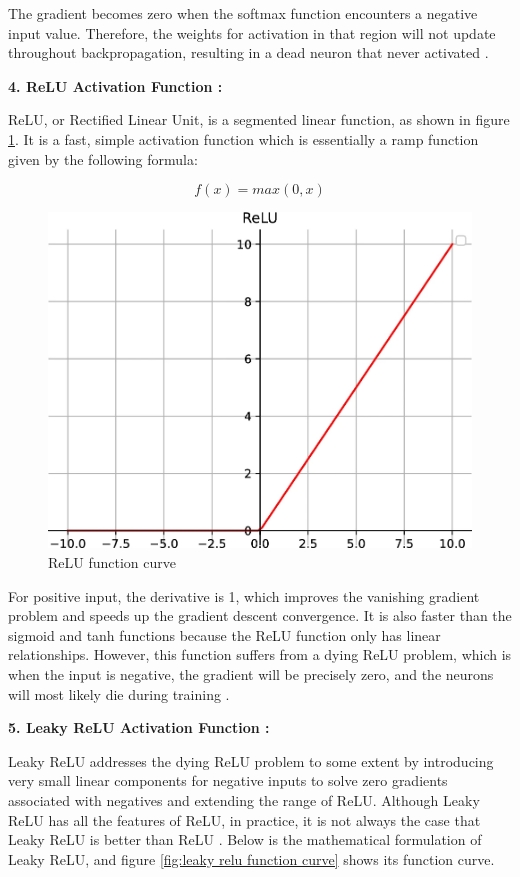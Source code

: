 The gradient becomes zero when the softmax function encounters a negative input value. Therefore, the weights for activation in that region will not update throughout backpropagation, resulting in a dead neuron that never activated \cite{Zhao2024}.

\textbf{4. ReLU Activation Function :}

ReLU, or Rectified Linear Unit, is a segmented linear function, as shown in figure \ref{fig:relu function curve}. It is a fast, simple activation function which is essentially a ramp function given by the following formula:

\[
    f(x) = max(0,x)
\]


\begin{figure}[H]
    \centering
    \includegraphics[width=1\linewidth]{Rohit_Master_Thesis//Images/relu_af.png}
    \caption{ReLU function curve \cite{Zhao2024}}
    \label{fig:relu function curve}
\end{figure}

For positive input, the derivative is 1, which improves the vanishing gradient problem and speeds up the gradient descent convergence. It is also faster than the sigmoid and tanh functions because the ReLU function only has linear relationships. However, this function suffers from a dying ReLU problem, which is when the input is negative, the gradient will be precisely zero, and the neurons will most likely die during training \cite{Zhao2024}.

\textbf{5. Leaky ReLU Activation Function :}

Leaky ReLU addresses the dying ReLU problem to some extent by introducing very small linear components for negative inputs to solve zero gradients associated with negatives and extending the range of ReLU. Although Leaky ReLU has all the features of ReLU, in practice, it is not always the case that Leaky ReLU is better than ReLU \cite{Zhao2024}. Below is the mathematical formulation of Leaky ReLU, and figure \ref{fig:leaky relu function curve} shows its function curve.

